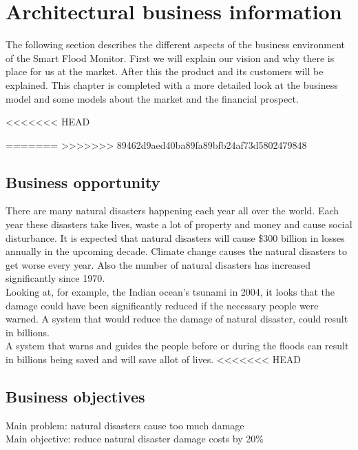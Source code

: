 \chapter{Architectural business information}
\label{ch:business}
The following section describes the different aspects of the business environment of the Smart Flood Monitor. First we will explain our vision and why there is place for us at the market. After this the product and its customers will be explained. This chapter is completed with a more detailed look at the business model and some models about the market and the financial prospect.

<<<<<<< HEAD

=======
>>>>>>> 89462d9aed40ba89fa89bfb24af73d5802479848
\section{Business opportunity}
There are many natural disasters happening each year all over the world. Each year these disasters take lives, waste a lot of property and money and cause social disturbance. It is expected that natural disasters will cause \$300 billion in losses annually in the upcoming decade. Climate change causes the natural disasters to get worse every year. Also the number of natural disasters has increased significantly since 1970.\\
Looking at, for example, the Indian ocean's tsunami in 2004, it looks that the damage could have been significantly reduced if the necessary people were warned. A system that would reduce the damage of natural disaster, could result in billions. \\
A system that warns and guides the people before or during the floods can result in billions being saved and will save allot of lives.
<<<<<<< HEAD


\section{Business objectives}
Main problem: natural disasters cause too much damage\\
Main objective: reduce natural disaster damage costs by 20\%

